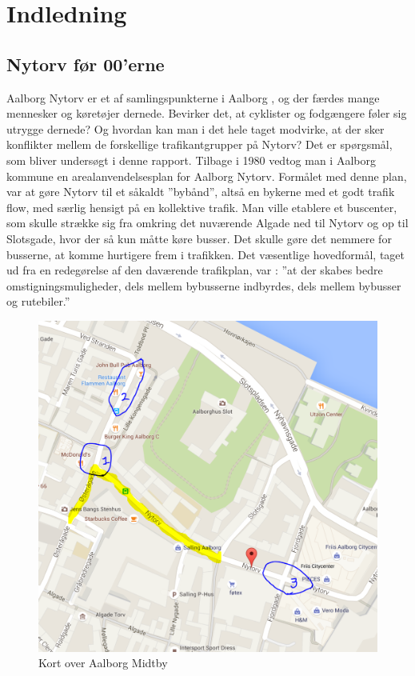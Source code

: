 \chapter{Indledning}
\label{chap:Indledning}

\section{Nytorv før 00'erne}
\label{sec:nytorv_foer_null}
Aalborg Nytorv er et af samlingspunkterne i Aalborg , og der færdes mange mennesker og køretøjer dernede. Bevirker det, at cyklister og fodgængere føler sig utrygge dernede? Og hvordan kan man i det hele taget modvirke, at der sker konflikter mellem de forskellige trafikantgrupper på Nytorv? Det er spørgsmål, som bliver undersøgt i denne rapport.
Tilbage i 1980 vedtog man i Aalborg kommune en arealanvendelsesplan for Aalborg Nytorv.
Formålet med denne plan, var at gøre Nytorv til et såkaldt ”bybånd”, altså en bykerne med et godt trafik flow, med særlig hensigt på en kollektive trafik. Man ville etablere et buscenter, som skulle strække sig fra omkring det nuværende Algade ned til Nytorv og op til Slotsgade, hvor der så kun måtte køre busser. Det skulle gøre det nemmere for busserne, at komme hurtigere frem i trafikken. Det  væsentlige hovedformål, taget ud fra en redegørelse af den daværende trafikplan, var :
”at der skabes bedre omstigningsmuligheder, dels mellem bybusserne     indbyrdes, dels mellem bybusser og rutebiler.”
\begin{figure}
\centering
\includegraphics[scale=0.5]{opserveringspunkter2.PNG}
\caption{Kort over Aalborg Midtby}
\end{figure}
